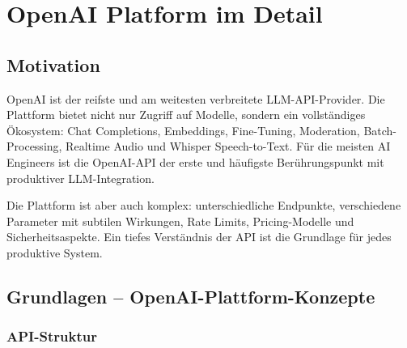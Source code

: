 \chapter{OpenAI Platform im Detail}
\label{chap:openai_platform}


\section{Motivation}

OpenAI ist der reifste und am weitesten verbreitete LLM-API-Provider. Die Plattform bietet nicht nur Zugriff auf Modelle, sondern ein vollständiges Ökosystem: Chat Completions, Embeddings, Fine-Tuning, Moderation, Batch-Processing, Realtime Audio und Whisper Speech-to-Text. Für die meisten AI Engineers ist die OpenAI-API der erste und häufigste Berührungspunkt mit produktiver LLM-Integration.

Die Plattform ist aber auch komplex: unterschiedliche Endpunkte, verschiedene Parameter mit subtilen Wirkungen, Rate Limits, Pricing-Modelle und Sicherheitsaspekte. Ein tiefes Verständnis der API ist die Grundlage für jedes produktive System.

\section{Grundlagen -- OpenAI-Plattform-Konzepte}

\subsection{API-Struktur}

